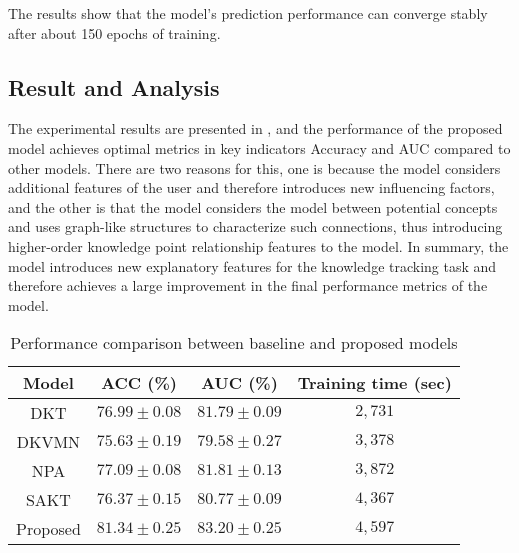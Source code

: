 The results show that the model's prediction performance can converge stably after about 150 epochs of training.
\subsection{Result and Analysis}
The experimental results are presented in \tblname{\ref{tbl:ch3-performance}}, and the performance of the proposed model achieves optimal metrics in key indicators Accuracy and AUC compared to other models. There are two reasons for this, one is because the model considers additional features of the user and therefore introduces new influencing factors, and the other is that the model considers the model between potential concepts and uses graph-like structures to characterize such connections, thus introducing higher-order knowledge point relationship features to the model. In summary, the model introduces new explanatory features for the knowledge tracking task and therefore achieves a large improvement in the final performance metrics of the model.

\begin{table}[htb]
    \centering
    \caption{Performance comparison between baseline and proposed models}\label{tbl:ch3-performance}
    \begin{tabular}{cccc}
        \toprule
        Model    & ACC (\%)                    & AUC (\%)                   & Training time (sec) \\
        \midrule
        DKT      & \(76.99\pm 0.08 \)          & \(81.79\pm 0.09\)          & \(2,731\)           \\
        DKVMN    & \(75.63\pm 0.19 \)          & \(79.58\pm 0.27\)          & \(3,378\)           \\
        NPA      & \(77.09\pm 0.08\)           & \(81.81\pm 0.13\)          & \(3,872\)           \\
        SAKT     & \(76.37\pm 0.15\)           & \(80.77\pm 0.09\)          & \(4,367\)           \\
        \midrule
        Proposed & \(\mathbf{81.34\pm 0.25} \) & \(\mathbf{83.20\pm 0.25}\) & \(4,597\)           \\
        \bottomrule
    \end{tabular}
\end{table}

